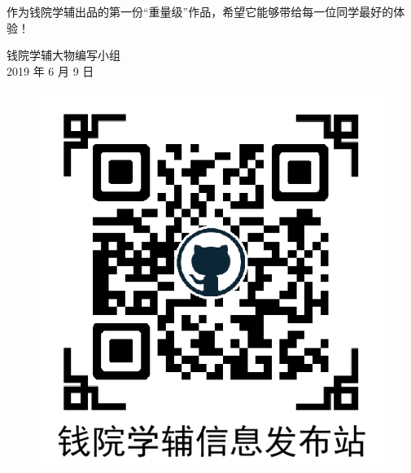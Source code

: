\documentclass[b5paper,opensource,sourcefont,parskip]{qyxf-book}
\begin{document}
作为钱院学辅出品的第一份“重量级”作品，希望它能够带给每一位同学最好的体验！

\begin{flushright}
钱院学辅大物编写小组\\
2019 年 6 月 9 日
\end{flushright}
\vspace{0.5cm}
\begin{figure}[!h]
	\centering
	\begin{minipage}[c]{0.5\textwidth}
		\centering
		\includegraphics[scale=0.5]{qrcode2.png}
	\end{minipage}%
	\begin{minipage}[c]{0.5\textwidth}
		\centering

\end{minipage}
\end{figure}
\end{document}
